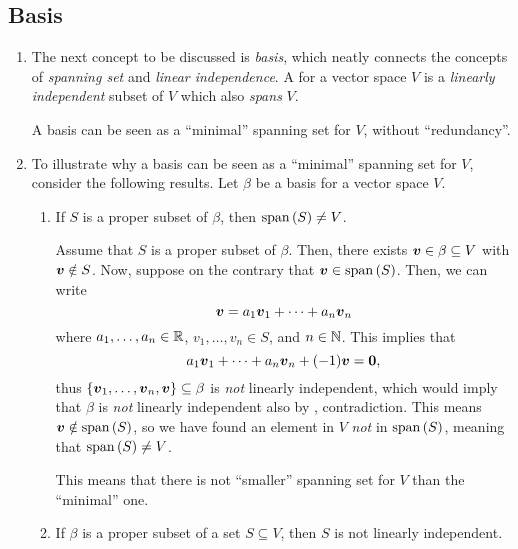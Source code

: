 \subsection{Basis}
\begin{enumerate}
\item The next concept to be discussed is \emph{basis}, which neatly connects
the concepts of \emph{spanning set} and \emph{linear independence}.  A
 for a vector space \(V\) is a \emph{linearly independent} subset
of \(V\) which also \emph{spans} \(V\).

\begin{intuition}
A basis can be seen as a ``minimal'' spanning set for \(V\), without
``redundancy''.
\end{intuition}

\item To illustrate why a basis can be seen as a ``minimal'' spanning set for
\(V\), consider the following results. Let \(\beta\) be a basis for a vector
space \(V\).
\begin{enumerate}
\item \label{it:span-set-not-smaller-than-basis} If \(S\) is a proper subset of \(\beta\), then \(\operatorname{span}\qty(S)\ne V\).

\begin{pf}
Assume that \(S\) is a proper subset of \(\beta\). Then, there exists
\(\vb*{v}\in\beta\subseteq V\) with \(\vb*{v}\notin S\). Now, suppose on the
contrary that \(\vb*{v}\in\operatorname{span}\qty(S)\). Then, we can write
\[
\vb*{v}=a_1\vb*{v}_1+\dotsb+a_n\vb*{v}_n
\]
where \(a_1,\dotsc,a_n\in\mathbb{R}\), \(v_1,\dotsc,v_n\in S\), and \(n\in\mathbb{N}\).
This implies that
\[
a_1\vb*{v}_1+\dotsb+a_n\vb*{v}_n+(-1)\vb*{v}=\vb*{0},
\]
thus \(\{\vb*{v}_1,\dotsc,\vb*{v}_n,\vb*{v}\}\subseteq \beta\) is \emph{not}
linearly independent, which would imply that \(\beta\) is \emph{not} linearly
independent also by , contradiction. This means
\(\vb*{v}\notin\operatorname{span}\qty(S)\), so we have found an element in \(V\) \emph{not} in
\(\operatorname{span}\qty(S)\), meaning that \(\operatorname{span}\qty(S)\ne V\).
\end{pf}

\begin{intuition}
This means that there is not ``smaller'' spanning set for \(V\) than the
``minimal'' one.
\end{intuition}
\item \label{it:span-set-greater-than-basis-ld} If \(\beta\) is a proper subset of a set \(S\subseteq V\), then \(S\) is
not linearly independent.


\end{enumerate}
\end{enumerate}
